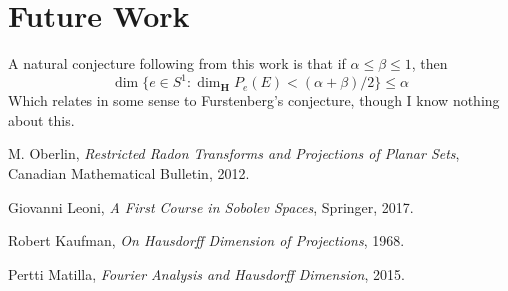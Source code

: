 \documentclass{article}
\theoremstyle{plain}
\theoremstyle{remark}
\theoremstyle{definition}
\begin{document}
\section{Future Work}

A natural conjecture following from this work is that if $\alpha \leq \beta \leq 1$, then
%
\[ \dim \{ e \in S^1: \dim_{\mathbf{H}} P_e(E) < (\alpha + \beta)/2 \} \leq \alpha \]
%
Which relates in some sense to Furstenberg's conjecture, though I know nothing about this.

\begin{comment}

\section{Besov Spaces}

Recall the Schwarz function $\varphi$ used to prove the Mihlin multiplier theorem. We now define functions $\varphi_k$ such that
%
\[ \widehat{\varphi_n}(\xi) = \varphi(2^{-n} \xi)\ \ \ \ \ \ \ \ \widehat{\psi}(\xi) = 1 - \sum_{n = 1}^\infty \varphi(2^{-n} \xi) \]
%
Thus $\varphi_n$ essentially covers the annulus $2^{n-1} \leq |\xi| \leq 2^{n+1}$, and the function $\psi$ covers the remaining low frequency parts covered in the frequency ball of radius 2. We have
%
\[ \varphi_n(\xi) = \widecheck{\varphi_{2^{-n}}}(\xi) = 2^{dn} \widecheck{\varphi}(2^n \xi) \]
%
Given $s \in \mathbf{R}$, and $1 \leq p, q \leq \infty$, we write
%
\[ \| f \|_{pq}^s = \| \psi * f \|_p + \left( \sum_{n = 1}^\infty (2^{sn} \| \varphi_k * f \|_p)^q \right)^{1/q} \]
%
The convolution $\varphi_n * f$ essentially captures the portion of $f$ whose frequencies lie in the annulus $2^{n-1} \leq |\xi| \leq 2^{n+1}$

\end{comment}

\begin{thebibliography}{9}

    M. Oberlin,
    \emph{Restricted Radon Transforms and Projections of Planar Sets},
    Canadian Mathematical Bulletin,
    2012.

    Giovanni Leoni,
    \emph{A First Course in Sobolev Spaces},
    Springer,
    2017.

	Robert Kaufman,
	\emph{On Hausdorff Dimension of Projections},
	1968.

	Pertti Matilla,
	\emph{Fourier Analysis and Hausdorff Dimension},
	2015.

\end{thebibliography}
\end{document}
